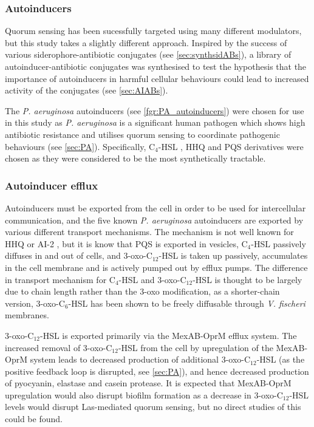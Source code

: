 \subsubsection{Autoinducers}

Quorum sensing has been sucessfully targeted using many different modulators\cite{Galloway2011,Hodgkinson2011}, but this study takes a slightly different approach. 
Inspired by the success of various siderophore-antibiotic conjugates (see \ref{sec:synthsidABs}), a library of autoinducer-antibiotic conjugates was synthesised to test the hypothesis that the importance of autoinducers in harmful cellular behaviours could lead to increased activity of the conjugates (see \ref{sec:AIABs}).

The \textit{P. aeruginosa} autoinducers (see \ref{fgr:PA_autoinducers}) were chosen for use in this study as \textit{P. aeruginosa} is a significant human pathogen which shows high antibiotic resistance and utilises quorum sensing to coordinate pathogenic behaviours (see \ref{sec:PA}). 
Specifically, C$_4$-HSL , HHQ  and PQS  derivatives were chosen as they were considered to be the most synthetically tractable.

\subsubsection{Autoinducer efflux\label{sec:AI_eff}}

Autoinducers must be exported from the cell in order to be used for intercellular communication, and the five known \textit{P. aeruginosa} autoinducers are exported by various different transport mechanisms.
The mechanism is not well known for HHQ  or AI-2 , but it is know that
PQS  is exported in vesicles\cite{Florez2017},
C$_4$-HSL  passively diffuses in and out of cells\cite{Pearson1999}, and
3-oxo-C$_{12}$-HSL  is taken up passively, accumulates in the cell membrane and is actively pumped out by efflux pumps.
The difference in transport mechanism for C$_4$-HSL  and 3-oxo-C$_{12}$-HSL  is thought to be largely due to chain length rather than the 3-oxo modification, as a shorter-chain version, 3-oxo-C$_6$-HSL  has been shown to be freely diffusable through \textit{V. fischeri} membranes\cite{Kaplan1985}.

3-oxo-C$_{12}$-HSL  is exported primarily via the MexAB-OprM efflux system\cite{Evans1998,Poole2004}.
The increased removal of 3-oxo-C$_{12}$-HSL  from the cell by upregulation of the MexAB-OprM system leads to decreased production of additional 3-oxo-C$_{12}$-HSL  (as the positive feedback loop is disrupted, see \ref{sec:PA}), and hence decreased production of pyocyanin, elastase and casein protease. 
It is expected that MexAB-OprM upregulation would also disrupt biofilm formation as a decrease in 3-oxo-C$_{12}$-HSL  levels would disrupt Las-mediated quorum sensing\cite{Davies1998}, but no direct studies of this could be found.

